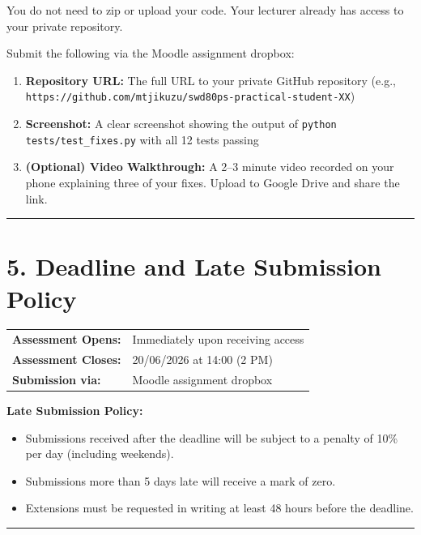 \documentclass[12pt,a4paper]{article}
\begin{document}
You do not need to zip or upload your code. Your lecturer already has access to your private repository.

Submit the following via the Moodle assignment dropbox:

\begin{enumerate}
  \item \textbf{Repository URL:} The full URL to your private GitHub repository (e.g., \texttt{https://github.com/mtjikuzu/swd80ps-practical-student-XX})
  \item \textbf{Screenshot:} A clear screenshot showing the output of \texttt{python tests/test\_fixes.py} with all 12 tests passing
  \item \textbf{(Optional) Video Walkthrough:} A 2--3 minute video recorded on your phone explaining three of your fixes. Upload to Google Drive and share the link.
\end{enumerate}

\vspace{0.5cm}
\hrule
\vspace{0.5cm}

\section*{5. Deadline and Late Submission Policy}

\begin{tabularx}{\textwidth}{@{}lX@{}}
\textbf{Assessment Opens:} & Immediately upon receiving access \\
\textbf{Assessment Closes:} & 20/06/2026 at 14:00 (2 PM) \\
\textbf{Submission via:} & Moodle assignment dropbox \\
\end{tabularx}

\vspace{0.3cm}
\textbf{Late Submission Policy:}
\begin{itemize}
  \item Submissions received after the deadline will be subject to a penalty of 10\% per day (including weekends).
  \item Submissions more than 5 days late will receive a mark of zero.
  \item Extensions must be requested in writing at least 48 hours before the deadline.
\end{itemize}

\vspace{0.5cm}
\hrule
\vspace{0.5cm}
\end{document}
